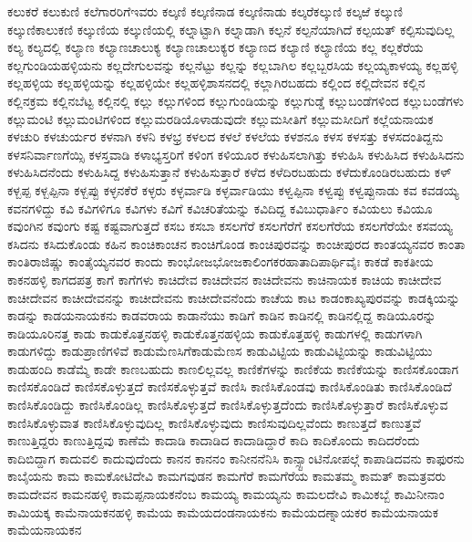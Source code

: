 {ಕಲುಕರೆ
ಕಲುಕುಣಿ
ಕಲೆಗಾರರಿಗೆಇವರು
ಕಲ್ಕಣಿ
ಕಲ್ಕಣಿನಾಡ
ಕಲ್ಕಣಿನಾಡು
ಕಲ್ಕರೆಕಲ್ಕುಣಿ
ಕಲ್ಕಱೆ
ಕಲ್ಕುಣಿ
ಕಲ್ಕುಣಿಕಾಲುಕಣಿ
ಕಲ್ಕುಣಿಯ
ಕಲ್ಕುಣಿಯಲ್ಲಿ
ಕಲ್ನಾಟ್ಟಾಗಿ
ಕಲ್ನಾಡಾಗಿ
ಕಲ್ಪನೆ
ಕಲ್ಪನೆಯಾಗಿದೆ
ಕಲ್ಪಯತ್
ಕಲ್ಪಿಸುವುದಿಲ್ಲ
ಕಲ್ಯ
ಕಲ್ಯದಲ್ಲಿ
ಕಲ್ಯಾಣ
ಕಲ್ಯಾಣಚಾಲುಕ್ಯ
ಕಲ್ಯಾಣಚಾಲುಕ್ಯರ
ಕಲ್ಯಾಣದ
ಕಲ್ಯಾಣಿ
ಕಲ್ಯಾಣಿಯ
ಕಲ್ಲ
ಕಲ್ಲಕೆರೆಯ
ಕಲ್ಲಗುಂಡಿಯಹಳ್ಳಿಯನು
ಕಲ್ಲದೇಗುಲವನ್ನು
ಕಲ್ಲನೆಟ್ಟು
ಕಲ್ಲನ್ನು
ಕಲ್ಲಬಾಗಿಲ
ಕಲ್ಲಬ್ಬರಸಿಯ
ಕಲ್ಲಯ್ಯಕಾಳಯ್ಯ
ಕಲ್ಲಹಳ್ಳಿ
ಕಲ್ಲಹಳ್ಳಿಯ
ಕಲ್ಲಹಳ್ಳಿಯನ್ನು
ಕಲ್ಲಹಳ್ಳಿಯೇ
ಕಲ್ಲಹಳ್ಳಿಶಾಸನದಲ್ಲಿ
ಕಲ್ಲಾಗಿರಬಹದು
ಕಲ್ಲಿಂದ
ಕಲ್ಲಿದೇವನ
ಕಲ್ಲಿನ
ಕಲ್ಲಿನಕ್ರಮ
ಕಲ್ಲಿನಬೆಟ್ಟ
ಕಲ್ಲಿನಲ್ಲಿ
ಕಲ್ಲು
ಕಲ್ಲುಗಳಿಂದ
ಕಲ್ಲುಗುಂಡಿಯನ್ನು
ಕಲ್ಲುಗುಡ್ಡೆ
ಕಲ್ಲುಬಂಡೆಗಳಿಂದ
ಕಲ್ಲುಬಂಡೆಗಳು
ಕಲ್ಲುಮಂಟಿ
ಕಲ್ಲುಮಂಟಿಗಳಿಂದ
ಕಲ್ಲುಮರಡಿಯೊಳಾಡುವುದೇ
ಕಲ್ಲುಮಸೀತಿಗೆ
ಕಲ್ಲುಮಸೀದಿಗೆ
ಕಲ್ಲೆಯನಾಯಕ
ಕಳಚುರಿ
ಕಳಚುರ್ಯರ
ಕಳನಾಗಿ
ಕಳನಿ
ಕಳಭ್ರ
ಕಳಲದ
ಕಳಲೆ
ಕಳಲೆಯ
ಕಳಶನೂ
ಕಳಸ
ಕಳಸತ್ತು
ಕಳಸದಂತಿದ್ದನು
ಕಳಸನಿರ್ವಾಣಗೆಯ್ಸಿ
ಕಳಸ್ತವಾಡಿ
ಕಳಾಭ್ಯಸ್ತರಿಗೆ
ಕಳಿಂಗ
ಕಳಿಯೂರ
ಕಳುಹಿಸಲಾಗಿತ್ತು
ಕಳುಹಿಸಿ
ಕಳುಹಿಸಿದ
ಕಳುಹಿಸಿದನು
ಕಳುಹಿಸಿದನೆಂದು
ಕಳುಹಿಸಿದ್ದ
ಕಳುಹಿಸುತ್ತಾನೆ
ಕಳುಹಿಸುತ್ತಾರೆ
ಕಳೆದ
ಕಳೆದಿರಬಹುದು
ಕಳೆದುಕೊಂಡಿರಬಹುದು
ಕಳ್
ಕಳ್ಬಪ್ಪ
ಕಳ್ಬಪ್ಪಿನಾ
ಕಳ್ಬಪ್ಪು
ಕಳ್ಳನಕೆರೆ
ಕಳ್ಳರು
ಕಳ್ಳರ್ವಾಡಿ
ಕಳ್ಳರ್ವಾಡಿಯು
ಕಳ್ವಪ್ಪಿನಾ
ಕಳ್ವಪ್ಪು
ಕಳ್ವಪ್ಪುನಾಡು
ಕವ
ಕವಡಯ್ಯ
ಕವನಗಳಿದ್ದು
ಕವಿ
ಕವಿಗಳಿಗೂ
ಕವಿಗಳು
ಕವಿಗೆ
ಕವಿಚರಿತೆಯನ್ನು
ಕವಿದಿದ್ದ
ಕವಿಬುಧಾರ್ತಿಂ
ಕವಿಯಲು
ಕವಿಯೂ
ಕವುಂಗಿನ
ಕವುಂಗು
ಕಷ್ಟ
ಕಷ್ಟವಾಗುತ್ತದೆ
ಕಸಬ
ಕಸಬಾ
ಕಸಲಗೆರೆ
ಕಸಲಗೆರೆಗೆ
ಕಸಲಗೆರೆಯ
ಕಸಲಗೆರೆಯೇ
ಕಸವಯ್ಯ
ಕಸಿದನು
ಕಸಿದುಕೊಂಡು
ಕಹಿನ
ಕಾಂಚಿಕಾಂಚನ
ಕಾಂಚಿಗೊಂಡ
ಕಾಂಚಿಪುರವನ್ನು
ಕಾಂಚೀಪುರದ
ಕಾಂತಯ್ಯನವರ
ಕಾಂತಾ
ಕಾಂತಿರಾಜಿಷ್ಣು
ಕಾಂತೈಯ್ಯನವರ
ಕಾಂದು
ಕಾಂಭೋಜಭೋಜಕಾಲಿಂಗಕರಹಾತಾದಿಪಾರ್ಥಿವೈಃ
ಕಾಕಡೆ
ಕಾಕತೀಯ
ಕಾಕನಹಳ್ಳಿ
ಕಾಗದಪತ್ರ
ಕಾಗೆ
ಕಾಗೆಗಳು
ಕಾಚಿದೇವ
ಕಾಚಿದೇವನ
ಕಾಚಿದೇವನು
ಕಾಚಿನಾಯಕ
ಕಾಚಿಯ
ಕಾಚೀದೇವ
ಕಾಚೀದೇವನ
ಕಾಚೀದೇವನನ್ನು
ಕಾಚೀದೇವನು
ಕಾಚೀದೇವನೆಂದು
ಕಾಚೆಯ
ಕಾಟ
ಕಾಡಂಕಾಖ್ಯಪುರವನ್ನು
ಕಾಡಕ್ಕಿಯನ್ನು
ಕಾಡನ್ನು
ಕಾಡಯನಾಯಕನು
ಕಾಡವರಾಯ
ಕಾಡಾನೆಯು
ಕಾಡಿಗೆ
ಕಾಡಿನ
ಕಾಡಿನಲ್ಲಿ
ಕಾಡಿನಲ್ಲಿದ್ದ
ಕಾಡಿಯೂರನ್ನು
ಕಾಡಿಯೂರಿನತ್ತ
ಕಾಡು
ಕಾಡುಕೊತ್ತನಹಳ್ಳಿ
ಕಾಡುಕೊತ್ತನಹಳ್ಳಿಯ
ಕಾಡುಕೊತ್ತಹಳ್ಳಿ
ಕಾಡುಗಳಲ್ಲಿ
ಕಾಡುಗಳಾಗಿ
ಕಾಡುಗಳಿದ್ದು
ಕಾಡುಪ್ರಾಣಿಗಳಿವೆ
ಕಾಡುಮೆಣಸಿಗೆಕಾಡುಮೆಣಸ
ಕಾಡುವಿಟ್ಟಿಯ
ಕಾಡುವಿಟ್ಟಿಯನ್ನು
ಕಾಡುವಿಟ್ಟಿಯು
ಕಾಡುಹಂದಿ
ಕಾಡೆಮ್ಮೆ
ಕಾಡೇ
ಕಾಣಬಹುದು
ಕಾಣಲಿಲ್ಲವಲ್ಲ
ಕಾಣಿಕೆಗಳನ್ನು
ಕಾಣಿಕೆಯ
ಕಾಣಿಕೆಯನ್ನು
ಕಾಣಿಸಕೊಂಡಾಗ
ಕಾಣಿಸಕೊಂಡಿದೆ
ಕಾಣಿಸಕೊಳ್ಳುತ್ತದೆ
ಕಾಣಿಸಕೊಳ್ಳುತ್ತವೆ
ಕಾಣಿಸಿ
ಕಾಣಿಸಿಕೊಂಡವು
ಕಾಣಿಸಿಕೊಂಡಿತು
ಕಾಣಿಸಿಕೊಂಡಿದೆ
ಕಾಣಿಸಿಕೊಂಡಿದ್ದು
ಕಾಣಿಸಿಕೊಂಡಿಲ್ಲ
ಕಾಣಿಸಿಕೊಳ್ಳುತ್ತದೆ
ಕಾಣಿಸಿಕೊಳ್ಳುತ್ತದೆಂದು
ಕಾಣಿಸಿಕೊಳ್ಳುತ್ತಾರೆ
ಕಾಣಿಸಿಕೊಳ್ಳುವ
ಕಾಣಿಸಿಕೊಳ್ಳುವಾತ
ಕಾಣಿಸಿಕೊಳ್ಳುವುದಿಲ್ಲ
ಕಾಣಿಸಿಕೊಳ್ಳುವುದು
ಕಾಣಿಸುವುದಿಲ್ಲವೆಂದು
ಕಾಣುತ್ತದೆ
ಕಾಣುತ್ತವೆ
ಕಾಣುತ್ತಿದ್ದರು
ಕಾಣುತ್ತಿದ್ದವು
ಕಾಣೆಮೆ
ಕಾದಾಡಿ
ಕಾದಾಡಿದ
ಕಾದಾಡಿದ್ದಾರೆ
ಕಾದಿ
ಕಾದಿಕೊಂದು
ಕಾದಿದರೆಂದು
ಕಾದಿಬಿದ್ದಾಗ
ಕಾದುವಲಿ
ಕಾದುವುದೆಂದು
ಕಾನನ
ಕಾನನಂ
ಕಾನೀನನೆನಿಸಿ
ಕಾನ್ಸ್ಟಾಂಟಿನೋಪಲ್ಗೆ
ಕಾಪಾಡಿದವನು
ಕಾಫುರನು
ಕಾಬೈಯನು
ಕಾಮ
ಕಾಮಕೋಟಿದೇವಿ
ಕಾಮಗವುಡನ
ಕಾಮಗೆರೆ
ಕಾಮಗೆರೆಯ
ಕಾಮತಮ್ಮ
ಕಾಮತ್
ಕಾಮತ್ರವರು
ಕಾಮದೇವನ
ಕಾಮನಹಳ್ಳಿ
ಕಾಮಪ್ಪನಾಯಕನೆಂಬ
ಕಾಮಯ್ಯ
ಕಾಮಯ್ಯನು
ಕಾಮಲದೇವಿ
ಕಾಮಿಕಬ್ಬೆ
ಕಾಮಿನೀನಾಂ
ಕಾಮಿಯಕ್ಕ
ಕಾಮೆನಾಯಕನಹಳ್ಳಿ
ಕಾಮೆಯ
ಕಾಮೆಯದಂಡನಾಯಕನು
ಕಾಮೆಯದಣ್ನಾಯಕರ
ಕಾಮೆಯನಾಯಕ
ಕಾಮೆಯನಾಯಕನ
}
